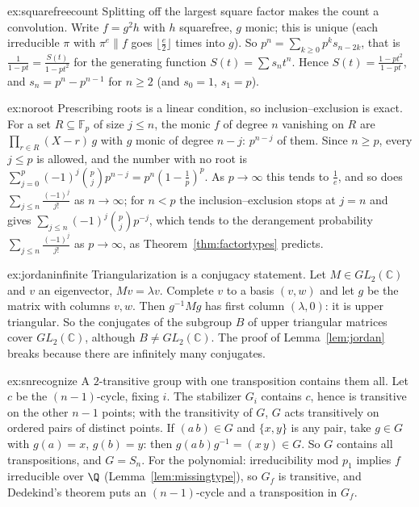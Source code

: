 \begin{solution}{ex:squarefreecount}
\idea Splitting off the largest square factor makes the count a convolution.
\writeup Write $f=g^2h$ with $h$ squarefree, $g$ monic; this is unique (each irreducible $\pi$ with $\pi^e\| f$ goes $\lfloor\frac e2\rfloor$ times into $g$). So $p^n=\sum_{k\ge0}p^ks_{n-2k}$, that is $\frac1{1-pt}=\frac{S(t)}{1-pt^2}$ for the generating function $S(t)=\sum s_nt^n$. Hence $S(t)=\frac{1-pt^2}{1-pt}$, and $s_n=p^n-p^{n-1}$ for $n\ge2$ (and $s_0=1$, $s_1=p$).
\end{solution}

\begin{solution}{ex:noroot}
\idea Prescribing roots is a linear condition, so inclusion--exclusion is exact.
\writeup For a set $R\subseteq\mathbb F_p$ of size $j\le n$, the monic $f$ of degree $n$ vanishing on $R$ are $\prod_{r\in R}(X-r)\,g$ with $g$ monic of degree $n-j$: $p^{n-j}$ of them. Since $n\ge p$, every $j\le p$ is allowed, and the number with no root is $\sum_{j=0}^p(-1)^j\binom pjp^{n-j}=p^n(1-\frac1p)^p$. As $p\to\infty$ this tends to $\frac1e$, and so does $\sum_{j\le n}\frac{(-1)^j}{j!}$ as $n\to\infty$; for $n<p$ the inclusion--exclusion stops at $j=n$ and gives $\sum_{j\le n}(-1)^j\binom pjp^{-j}$, which tends to the derangement probability $\sum_{j\le n}\frac{(-1)^j}{j!}$ as $p\to\infty$, as Theorem~\ref{thm:factortypes} predicts.
\end{solution}

\begin{solution}{ex:jordaninfinite}
\idea Triangularization is a conjugacy statement.
\writeup Let $M\in GL_2(\mathbb C)$ and $v$ an eigenvector, $Mv=\lambda v$. Complete $v$ to a basis $(v,w)$ and let $g$ be the matrix with columns $v,w$. Then $g^{-1}Mg$ has first column $(\lambda,0)$: it is upper triangular. So the conjugates of the subgroup $B$ of upper triangular matrices cover $GL_2(\mathbb C)$, although $B\ne GL_2(\mathbb C)$. The proof of Lemma~\ref{lem:jordan} breaks because there are infinitely many conjugates.
\end{solution}

\begin{solution}{ex:snrecognize}
\idea A $2$-transitive group with one transposition contains them all.
\writeup Let $c$ be the $(n-1)$-cycle, fixing $i$. The stabilizer $G_i$ contains $c$, hence is transitive on the other $n-1$ points; with the transitivity of $G$, $G$ acts transitively on ordered pairs of distinct points. If $(a\,b)\in G$ and $\{x,y\}$ is any pair, take $g\in G$ with $g(a)=x$, $g(b)=y$: then $g(a\,b)g^{-1}=(x\,y)\in G$. So $G$ contains all transpositions, and $G=S_n$. For the polynomial: irreducibility mod $p_1$ implies $f$ irreducible over $\Q$ (Lemma~\ref{lem:missingtype}), so $G_f$ is transitive, and Dedekind's theorem puts an $(n-1)$-cycle and a transposition in $G_f$.
\end{solution}

